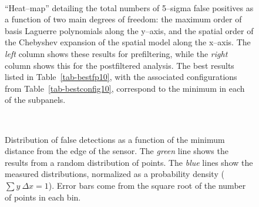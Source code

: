 \documentclass[prd, nofootinbib, floatfix, 11pt,tightenlines,times]{article}
\begin{document}
{\begin{figure}
 \\
\caption{``Heat--map'' detailing the total numbers of 5--sigma false
  positives as a function of two main degrees of freedom: the maximum
  order of basis Laguerre polynomials along the y--axis, and the
  spatial order of the Chebyshev expansion of the spatial model along
  the x--axis.  The {\it left} column shows these results for
  prefiltering, while the {\it right} column shows this for the
  postfiltered analysis.  The best results listed in
  Table~\ref{tab-bestfp10}, with the associated configurations from
  Table~\ref{tab-bestconfig10}, correspond to the minimum in each of the
  subpanels.  }
\label{fp_heatmap}
\end{figure}


\begin{figure}
 \\
\caption{Distribution of false detections as a function of the minimum
  distance from the edge of the sensor.  The {\it green} line shows
  the results from a random distribution of points.  The {\it blue}
  lines show the measured distributions, normalized as a probability
  density ($\sum y~\Delta x = 1$).  Error bars come from the square
  root of the number of points in each bin. }
\label{edgedist}
\end{figure}

}
\end{document}
